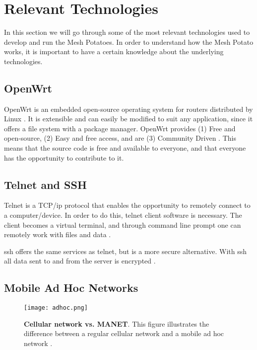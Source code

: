 \section{Relevant Technologies}
In this section we will go through some of the most relevant technologies used to develop and run the Mesh Potatoes. In order to understand how the Mesh Potato works, it is important to have a certain knowledge about the underlying technologies. 

\subsection{OpenWrt}
\label{subsec:openwrt}
OpenWrt is an embedded open-source operating system for routers distributed by Linux \cite{openwrt}. It is extensible and can easily be modified to suit any application, since it offers a file system with a package manager. OpenWrt provides (1) Free and open-source, (2) Easy and free access, and are (3) Community Driven \cite{openwrt}. This means that the source code is free and available to everyone, and that everyone has the opportunity to contribute to it. 

\subsection{Telnet and SSH}

Telnet is a TCP/\gls{ip} protocol that enables the opportunity to remotely connect to a computer/device. In order to do this, telnet client software is necessary. The client becomes a virtual terminal, and through command line prompt one can remotely work with files and data \cite{telnet}. 

\gls{ssh} offers the same services as telnet, but is a more secure alternative. With \gls{ssh} all data sent to and from the server is encrypted \cite{SSH}. 


\subsection{Mobile Ad Hoc Networks}

\begin{figure}[b]
  \centering
    \texttt{[image: adhoc.png]}
     \caption [Cellular network vs. MANET]{\textbf{Cellular network vs. MANET}. This figure illustrates the difference between a regular cellular network and a mobile ad hoc network \cite{adhoc2}.}
\label{fig:adhoc}
\end{figure}


